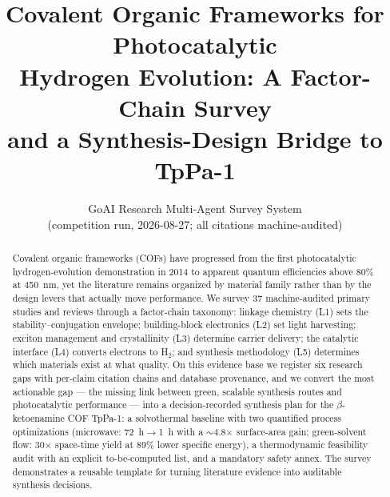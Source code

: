 \documentclass[11pt]{article}
\title{Covalent Organic Frameworks for Photocatalytic\\
Hydrogen Evolution: A Factor-Chain Survey\\
and a Synthesis-Design Bridge to TpPa-1}
\author{GoAI Research Multi-Agent Survey System\\
\small (competition run, 2026-08-27; all citations machine-audited)}
\date{}
\begin{document}
\maketitle

\begin{abstract}
Covalent organic frameworks (COFs) have progressed from the first photocatalytic
hydrogen-evolution demonstration in 2014 to apparent quantum efficiencies above 80\% at 450~nm,
yet the literature remains organized by material family rather than by the design levers that
actually move performance. We survey 37 machine-audited primary studies and reviews through a
factor-chain taxonomy: linkage chemistry (L1) sets the stability--conjugation envelope;
building-block electronics (L2) set light harvesting; exciton management and crystallinity
(L3) determine carrier delivery; the catalytic interface (L4) converts electrons to H$_2$; and
synthesis methodology (L5) determines which materials exist at what quality. On this evidence
base we register six research gaps with per-claim citation chains and database provenance, and
we convert the most actionable gap --- the missing link between green, scalable synthesis
routes and photocatalytic performance --- into a decision-recorded synthesis plan for the
$\beta$-ketoenamine COF TpPa-1: a solvothermal baseline with two quantified process
optimizations (microwave: 72~h$\rightarrow$1~h with a $\sim$4.8$\times$ surface-area gain;
green-solvent flow: 30$\times$ space-time yield at 89\% lower specific energy), a
thermodynamic feasibility audit with an explicit to-be-computed list, and a mandatory safety
annex. The survey demonstrates a reusable template for turning literature evidence into
auditable synthesis decisions.
\end{abstract}









\clearpage



\end{document}

